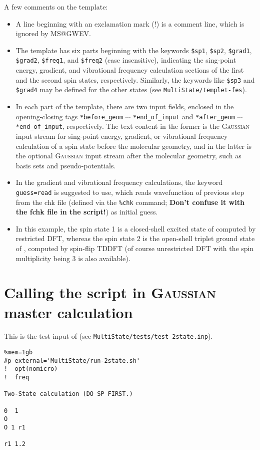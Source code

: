 \documentclass[UTF8]{article}
\begin{document}
A few comments on the template:
\begin{itemize}
\item A line beginning with an exclamation mark (!) is a comment line, which is ignored by MS@GWEV.
\item The template has six parts beginning with the keywords \verb|$sp1|, \verb|$sp2|, \verb|$grad1|, \verb|$grad2|, \verb|$freq1|, and \verb|$freq2| (case insensitive),
    indicating the sing-point energy, gradient, and vibrational frequency calculation sections of the first and the second spin states, respectively.
    Similarly, the keywords like \verb|$sp3| and \verb|$grad4| may be defined for the other states (see \verb|MultiState/templet-fes|).
\item In each part of the template, there are two input fields, enclosed in the opening-closing tags \verb|*before_geom| $\cdots$ \verb|*end_of_input| and \verb|*after_geom| $\cdots$ \verb|*end_of_input|, respectively.
    The text content in the former is the \textsc{Gaussian} input stream for sing-point energy, gradient, or vibrational frequency calculation of a spin state before the molecular geometry,
    and in the latter is the optional \textsc{Gaussian} input stream after the molecular geometry, such as basis sets and pseudo-potentials.
\item In the gradient and vibrational frequency calculations, the keyword \verb|guess=read| is suggested to use, which reads wavefunction of previous step from the chk file (defined via the \verb|%chk| command; \textbf{Don't confuse it with the fchk file in the script!}) as initial guess.
\item In this example, the spin state 1 is a closed-shell excited state of  computed by restricted DFT, whereas the spin state 2 is the open-shell triplet ground state of , computed by spin-flip TDDFT (of course unrestricted DFT with the spin multiplicity being 3 is also available).
\end{itemize}

\section{Calling the script in \textsc{Gaussian} master calculation}

This is the test input of  (see \verb|MultiState/tests/test-2state.inp|).
\begin{lstlisting}[alsoletter={\%\#},morekeywords={\%nprocshared,\%mem,\#p,gb,external}]
%nprocshared=1
%mem=1gb
#p external='MultiState/run-2state.sh'
!  opt(nomicro)
!  freq

Two-State calculation (DO SP FIRST.)

0  1
O
O 1 r1

r1 1.2
\end{lstlisting}
\end{document}
